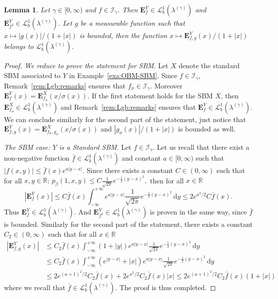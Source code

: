 \documentclass[12pt]{article}
\numberwithin{equation}{section}
\newtheorem{lemma}{Lemma}
\theoremstyle{definition}
\theoremstyle{remark}
\newcommand{\vd}{\,\mathrm{d}}
\newcommand{\Lgb}[1]{\mathcal{L}^{1}_{b}(\lambda^{(#1)})}
\newcommand{\Lg}[1]{\mathcal{I}_{#1}}
\newcommand{\bfF}[1]{\mathbf{E}^X_{#1}}
\newcommand{\bfH}[1]{\mathbf{E}^Y_{#1}}
\begin{document}
\begin{lemma} \label{lem:link:theorems}
Let $\gamma \in [0,\infty)$ and $f\in \Lg{\gamma}$. Then $\bfH{f} \in \Lgb{\gamma}$ and $\bfH{f^2} \in \Lgb{\gamma}$. 
Let $g$ be a measurable function such that $x \mapsto |g(x)|/(1+|x|)$ is bounded,
then the function $x\mapsto \bfH{f,g}(x)/(1+|x|)$ belongs to $\Lgb{\gamma}$.
\end{lemma}
%
%
%
\begin{proof}
\emph{ We reduce to prove the statement for SBM. } 
Let $X$ denote the standard SBM associated to $Y$ in Example~\ref{exa:OBM-SBM}. 
Since $f\in \Lg{\gamma}$, Remark~\ref{rem:Lgb:remarks} ensures that $f_\sigma\in \Lg{\gamma}$.
Moreover 
$
	\bfH {f}(x)= \bfF{f_\sigma}(x/\sigma(x)).
$
If the first statement holds for the SBM $X$, then $\bfF{f_\sigma} \in \Lgb{\gamma}$
and Remark~\ref{rem:Lgb:remarks} ensures that $\bfH {f} \in \Lgb{\gamma}$.
%
We can conclude similarly for the second part of the statement, just notice that
$
	\bfH {f,g}(x)= \bfF{f_\sigma,g_\sigma}(x/\sigma(x))
$
and $|g_\sigma(x)|/(1+|x|)$ is bounded as well.



\emph{The SBM case: $Y$ is a Standard SBM.}
Let $f\in \Lg{\gamma}$. 
Let us recall that there exist a non-negative function $ \bar f \in \Lgb{\gamma}$ and constant $a \in [0,\infty)$ such that $|f(x,y)| \leq \bar f(x) e^{a|y-x|}$.
Since there exists a constant $C\in (0,\infty)$ such that for all $x,y\in \mathbb R$:
$
	p_\beta (1,x,y) \leq %
	C \frac1{\sqrt{2\pi}} e^{-\frac12(y-x)^2},%
$ 
then for all $x\in \mathbb R$
\[	
	|\bfH{f}(x)| 
	\leq C \bar f(x) \int_{-\infty}^{+\infty} e^{a |y-x|}  \frac1{\sqrt{2\pi}} e^{-\frac12(y-x)^2} \vd y
	\leq 2 e^{a^2/2} C \bar f(x).
\]	
Thus $ \bfH{f} \in \Lgb{\gamma}$.
And $\bfH{f^2} \in \Lgb{\gamma}$ is proven in the same way, since $\bar f$ is bounded.
%
Similarly for the second part of the statement, there exists a constant $C_2\in (0,\infty)$ such that
for all $x\in \mathbb R$
\[	
\begin{split}
	|\bfH{f,g}(x)| 
	& \leq C_2 \bar f(x) \int_{-\infty}^{+\infty} (1+|y|) e^{a |y-x|}  \frac1{\sqrt{2\pi}} e^{-\frac12(y-x)^2} \vd y
	\\
	& \leq C_2 \bar f(x) \int_{-\infty}^{+\infty} (e^{|y-x|}+|x|) e^{a |y-x|}  \frac1{\sqrt{2\pi}} e^{-\frac12(y-x)^2} \vd y
	\\
	& \leq  2 e^{(a+1)^2/2} C_2 \bar f(x) +  2 e^{a^2/2} C_2 \bar f(x) |x| 
	\leq 2 e^{(a+1)^2/2} C_2 \bar f(x) (1+|x|)
\end{split}
\]	
where we recall that $ \bar f \in \Lgb{\gamma}$.
The proof is thus completed.
\end{proof}
\end{document}
